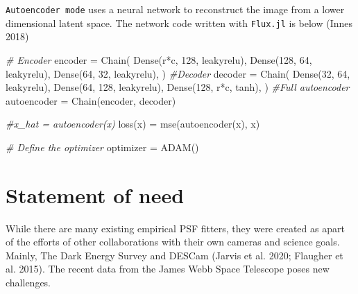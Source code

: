 \documentclass[
]{article}
\newenvironment{Shaded}{}{}
\newcommand{\CommentTok}[1]{\textcolor[rgb]{0.38,0.63,0.69}{\textit{#1}}}
\newcommand{\FloatTok}[1]{\textcolor[rgb]{0.25,0.63,0.44}{#1}}
\newcommand{\NormalTok}[1]{#1}
\newcommand{\OperatorTok}[1]{\textcolor[rgb]{0.40,0.40,0.40}{#1}}
\begin{document}
\texttt{Autoencoder\ mode} uses a neural network to reconstruct the
image from a lower dimensional latent space. The network code written
with \texttt{Flux.jl} is below (Innes 2018)

\begin{Shaded}
\begin{Highlighting}[]
\CommentTok{\# Encoder    }
\NormalTok{encoder }\OperatorTok{=}\NormalTok{ Chain(    }
\NormalTok{                Dense(r}\OperatorTok{*}\NormalTok{c}\OperatorTok{,} \FloatTok{128}\OperatorTok{,}\NormalTok{ leakyrelu)}\OperatorTok{,}    
\NormalTok{                Dense(}\FloatTok{128}\OperatorTok{,} \FloatTok{64}\OperatorTok{,}\NormalTok{ leakyrelu)}\OperatorTok{,}    
\NormalTok{                Dense(}\FloatTok{64}\OperatorTok{,} \FloatTok{32}\OperatorTok{,}\NormalTok{ leakyrelu)}\OperatorTok{,}    
\NormalTok{               )    }
\CommentTok{\#Decoder}
\NormalTok{decoder }\OperatorTok{=}\NormalTok{ Chain(    }
\NormalTok{                Dense(}\FloatTok{32}\OperatorTok{,} \FloatTok{64}\OperatorTok{,}\NormalTok{ leakyrelu)}\OperatorTok{,}    
\NormalTok{                Dense(}\FloatTok{64}\OperatorTok{,} \FloatTok{128}\OperatorTok{,}\NormalTok{ leakyrelu)}\OperatorTok{,}    
\NormalTok{                Dense(}\FloatTok{128}\OperatorTok{,}\NormalTok{ r}\OperatorTok{*}\NormalTok{c}\OperatorTok{,}\NormalTok{ tanh)}\OperatorTok{,}    
\NormalTok{               )    }
\CommentTok{\#Full autoencoder}
\NormalTok{autoencoder }\OperatorTok{=}\NormalTok{ Chain(encoder}\OperatorTok{,}\NormalTok{ decoder)    }
                      
\CommentTok{\#x\_hat = autoencoder(x)    }
\NormalTok{loss(x) }\OperatorTok{=}\NormalTok{ mse(autoencoder(x)}\OperatorTok{,}\NormalTok{ x)    }
    
\CommentTok{\# Define the optimizer    }
\NormalTok{optimizer }\OperatorTok{=}\NormalTok{ ADAM()    }
\end{Highlighting}
\end{Shaded}

\hypertarget{statement-of-need}{%
\section{Statement of need}\label{statement-of-need}}

While there are many existing empirical PSF fitters, they were created
as apart of the efforts of other collaborations with their own cameras
and science goals. Mainly, The Dark Energy Survey and DESCam (Jarvis et
al. 2020; Flaugher et al. 2015). The recent data from the James Webb
Space Telescope poses new challenges.
\end{document}
